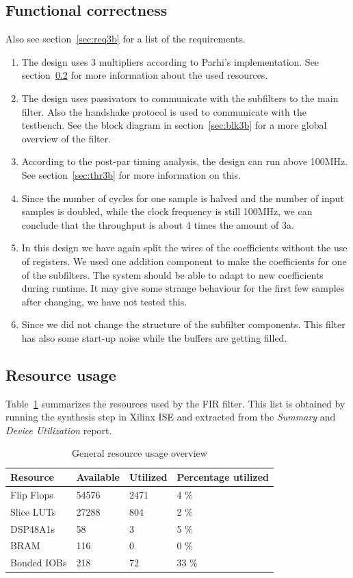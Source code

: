 \documentclass[a4paper,twoside,11pt, fleqn]{article}
\begin{document}
\subsection{Functional correctness}
Also see section~\ref{sec:req3b} for a list of the requirements.
\begin{enumerate}
\item The design uses 3 multipliers according to Parhi's implementation. See section~\ref{sec:resc3b} for more information about the used resources. 
\item The design uses passivators to communicate with the subfilters to the main filter. Also the handshake protocol is used to communicate with the testbench. See the block diagram in section~\ref{sec:blk3b} for a more global overview of the filter. 
\item According to the post-par timing analysis, the design can run above 100MHz. See section~\ref{sec:thr3b} for more information on this.
\item Since the number of cycles for one sample is halved and the number of input samples is doubled, while the clock frequency is still 100MHz, we can conclude that the throughput is about 4 times the amount of 3a.
\item In this design we have again split the wires of the coefficients without the use of registers. We used one addition component to make the coefficients for one of the subfilters. The system should be able to adapt to new coefficients during runtime. It may give some strange behaviour for the first few samples after changing, we have not tested this.
\item Since we did not change the structure of the subfilter components. This filter has also some start-up noise while the buffers are getting filled.
\end{enumerate}

\subsection{Resource usage}
\label{sec:resc3b}

Table~\ref{tab:3busage} summarizes the resources used by the FIR filter. This list is obtained by running the synthesis step in Xilinx ISE and extracted from the \textit{Summary} and \textit{Device Utilization} report.

\begin{table}[h]
\begin{tabular}{|l|l|l|l|}
\hline
\textbf{Resource} & \textbf{Available} & \textbf{Utilized} & \textbf{Percentage utilized}\\
\hline
Flip Flops	& 54576 & 2471 	& 4 \%\\
Slice LUTs 	& 27288 & 804 	& 2 \%\\
DSP48A1s	& 58 	& 3 	& 5 \%\\
BRAM		& 116 	& 0 	& 0 \%\\
Bonded IOBs	& 218 	& 72 	& 33 \%\\
\hline
\end{tabular}
\caption{General resource usage overview}
\label{tab:3busage}
\end{table}
\end{document}

